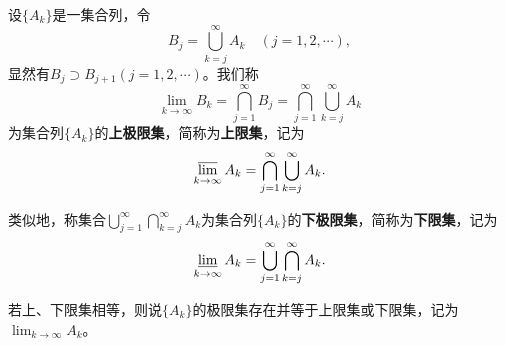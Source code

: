 \documentclass[../../main.tex]{subfiles}
\begin{document}
\begin{definition}[上、下极限集]\label{definition:上、下极限集}
  设\(\{A_k\}\)是一集合列，令
\[B_j=\bigcup_{k = j}^{\infty}A_k\quad (j = 1,2,\cdots),\]
显然有\(B_j\supset B_{j + 1}(j = 1,2,\cdots)\)。我们称
\[\lim_{k\rightarrow\infty}B_k=\bigcap_{j = 1}^{\infty}B_j=\bigcap_{j = 1}^{\infty}\bigcup_{k = j}^{\infty}A_k\]
为集合列\(\{A_k\}\)的\textbf{上极限集}，简称为\textbf{上限集}，记为
\[\varlimsup_{k\rightarrow\infty}A_k=\bigcap_{j = 1}^{\infty}\bigcup_{k = j}^{\infty}A_k.\]

类似地，称集合\(\bigcup_{j = 1}^{\infty}\bigcap_{k = j}^{\infty}A_k\)为集合列\(\{A_k\}\)的\textbf{下极限集}，简称为\textbf{下限集}，记为
\[\varliminf_{k\rightarrow\infty}A_k=\bigcup_{j = 1}^{\infty}\bigcap_{k = j}^{\infty}A_k.\]

若上、下限集相等，则说\(\{A_k\}\)的极限集存在并等于上限集或下限集，记为\(\lim_{k\rightarrow\infty}A_k\)。
\end{definition}
\end{document}
